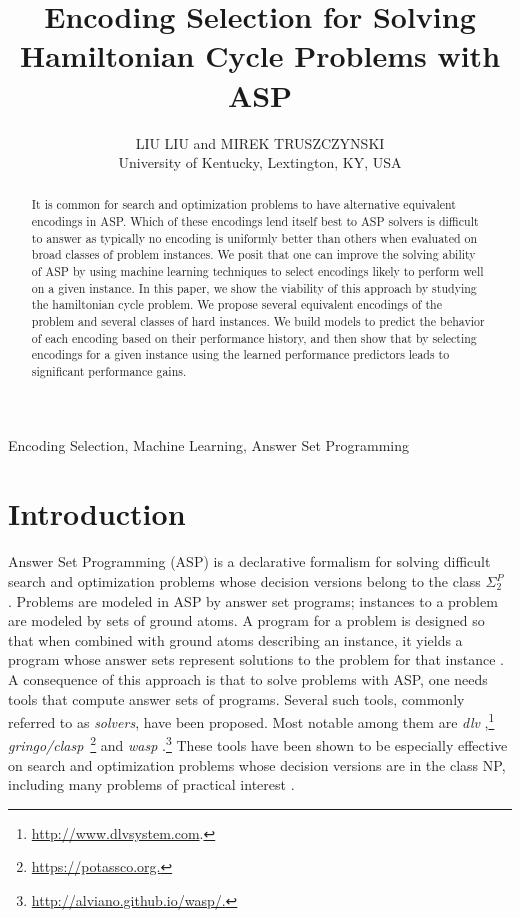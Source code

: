 \documentclass{new_tlp}
\title[Theory and Practice of Logic Programming]
        {Encoding Selection for Solving Hamiltonian Cycle Problems with ASP}
\author[Liu Liu and Mirek Truszczynki]
 {LIU LIU and MIREK TRUSZCZYNSKI\\
 University of Kentucky, Lextington, KY, USA\\
 \email{liu.liu@uky.edu and mirek@uky.edu}}
\begin{document}
\nocite{*}%


\label{firstpage}

\maketitle

  \begin{abstract}
It is common for search and optimization problems to have alternative equivalent encodings in ASP. 
Which of these encodings lend itself best to ASP solvers is 
difficult to answer as typically no encoding is uniformly better 
than others when evaluated on broad classes of problem instances.
We posit that one can improve the solving ability of ASP by using machine 
learning techniques to select encodings likely to perform well on 
a given instance. In this paper, we show the viability of this approach by 
studying the hamiltonian cycle problem. We propose several equivalent 
encodings of the problem and several classes of hard instances. We build models to 
predict the behavior of each encoding based on their performance history, 
and then show that by selecting encodings for a given instance 
using the learned performance predictors leads to significant performance gains.
    
  \end{abstract}

  \begin{keywords}
    Encoding Selection, Machine Learning, Answer Set Programming
  \end{keywords}


\section{Introduction}
Answer Set Programming (ASP) is a declarative formalism for solving difficult 
search and optimization problems whose decision versions belong to the 
class $\Sigma_2^P$ \cite{BrewkaET11}. Problems are modeled in ASP by answer 
set programs; instances to a problem are modeled by sets of ground atoms. 
A program for a problem is designed so that when combined with ground atoms 
describing an instance, it yields a program whose answer sets represent
solutions to the problem for that instance \cite{mt99}. A consequence of this
approach is that to solve problems with ASP, one needs tools that compute 
answer sets of programs. Several such tools, commonly referred to as 
\emph{solvers}, have been proposed. Most notable among them are \textit{dlv} 
\cite{LeonePFEGPS06},\footnote{\url{http://www.dlvsystem.com}.} 
\textit{gringo/clasp}~\cite{potsdamBook}\footnote{\url{https://potassco.org.}} 
and \textit{wasp} \cite{AlvianoDFLR13}.\footnote{\url{http://alviano.github.io/wasp/.}} 
These tools have been shown to be especially effective on search and 
optimization problems whose decision versions are in the class NP, including 
many problems of practical interest \cite{GebserMR17,ErdemGL16}. 
\end{document}
